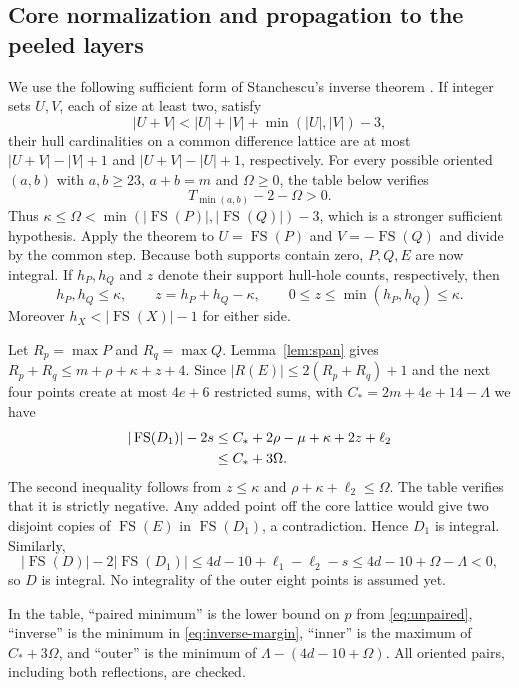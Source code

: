 \documentclass[11pt,a4paper]{article}
\newcommand{\FS}{\operatorname{FS}}
\begin{document}
\subsection{Core normalization and propagation to the peeled layers}
We use the following sufficient form of Stanchescu's inverse theorem
\cite[Corollary 2]{Stanchescu}. If integer sets $U,V$, each of size at
least two, satisfy
\[
 |U+V|<|U|+|V|+\min(|U|,|V|)-3,
\]
their hull cardinalities on a common difference lattice are at most
$|U+V|-|V|+1$ and $|U+V|-|U|+1$, respectively.
For every possible oriented $(a,b)$ with $a,b\ge23$, $a+b=m$ and
$\Omega\ge0$, the table below verifies
\begin{equation}\label{eq:inverse-margin}
 T_{\min(a,b)}-2-\Omega>0.
\end{equation}
Thus $\kappa\le\Omega<\min(|\FS(P)|,|\FS(Q)|)-3$, which is a
stronger sufficient hypothesis. Apply the theorem to
$U=\FS(P)$ and $V=-\FS(Q)$ and divide by the common step. Because both
supports contain zero, $P,Q,E$ are now integral. If $h_P,h_Q$ and $z$
denote their support hull-hole counts, respectively, then
\begin{equation}\label{eq:holes}
 h_P,h_Q\le\kappa,\qquad z=h_P+h_Q-\kappa,\qquad
 0\le z\le\min(h_P,h_Q)\le\kappa.
\end{equation}
Moreover $h_X<|\FS(X)|-1$ for either side.

Let $R_p=\max P$ and $R_q=\max Q$. Lemma~\ref{lem:span} gives
$R_p+R_q\le m+\rho+\kappa+z+4$. Since
$|R(E)|\le2(R_p+R_q)+1$ and the next four points create at most $4e+6$
restricted sums, with $C_*=2m+4e+14-\Lambda$ we have
\begin{align}
 |\FS(D_1)|-2s
 &\le C_*+2\rho-\mu+\kappa+2z+\ell_2\notag\\
 &\le C_*+3\Omega.\label{eq:inner}
\end{align}
The second inequality follows from $z\le\kappa$ and
$\rho+\kappa+\ell_2\le\Omega$. The table verifies that it is strictly
negative. Any added point off the core lattice would give two disjoint
copies of $\FS(E)$ in $\FS(D_1)$, a contradiction. Hence $D_1$ is integral.
Similarly,
\begin{equation}\label{eq:outer}
 |\FS(D)|-2|\FS(D_1)|\le4d-10+\ell_1-\ell_2-s
 \le4d-10+\Omega-\Lambda<0,
\end{equation}
so $D$ is integral. No integrality of the outer eight points is assumed yet.

In the table, ``paired minimum'' is the lower bound on $p$ from
\eqref{eq:unpaired}, ``inverse'' is the minimum in
\eqref{eq:inverse-margin}, ``inner'' is the maximum of $C_*+3\Omega$,
and ``outer'' is the minimum of $\Lambda-(4d-10+\Omega)$.
All oriented pairs, including both reflections, are checked.
\end{document}

